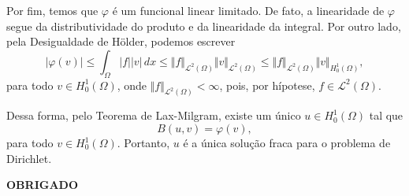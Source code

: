 \documentclass[xcolor=dvipsnames, aspectratio=169, 10pt]{beamer}
\newcommand{\cL}{\mathcal{L}}
\begin{document}
\begin{frame}
    Por fim, temos que $\varphi$ é um funcional linear limitado.
De fato, a linearidade de $\varphi$ segue da distributividade do produto e da linearidade da integral.
Por outro lado, pela Desigualdade de Hölder, podemos escrever
\[
    |\varphi(v)| \leqslant \int_\Omega |f| |v| \,dx \leqslant \Vert f \Vert_{\cL^2(\Omega)} \Vert v \Vert_{\cL^2(\Omega)} \leqslant \Vert f \Vert_{\cL^2(\Omega)} \Vert v \Vert_{H^1_0(\Omega)},
\]
para todo $v \in H^1_0(\Omega)$, onde $\Vert f \Vert_{\cL^2(\Omega)} < \infty$, pois, por hípotese, $f \in \cL^2(\Omega)$.
\end{frame}
\begin{frame}
    Dessa forma, pelo Teorema de Lax-Milgram, existe um único $u \in H^1_0(\Omega)$ tal que
\[
    B(u,v) = \varphi(v),
\]
para todo $v \in H^1_0(\Omega)$.
Portanto, $u$ é a única solução fraca para o problema de Dirichlet.
\end{frame}
\begin{frame}
    \begin{center}
        \huge\bfseries OBRIGADO
    \end{center}
\end{frame}
\end{document}

